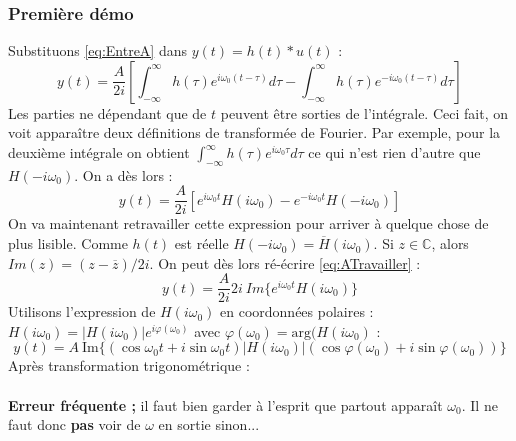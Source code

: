 \subsubsection{Première démo}
Substituons \autoref{eq:EntreA} dans $y(t) = h(t)*u(t)$ :
\begin{equation}
	y(t) = \dfrac{A}{2i}\left[\int_{-\infty}^\infty h(\tau)e^{i\omega_0(t-\tau)}d\tau-
	\int_{-\infty}^\infty h(\tau)e^{-i\omega_0(t-\tau)}d\tau\right]
\end{equation}
Les parties ne dépendant que de $t$ peuvent être sorties de l'intégrale. Ceci fait, 
on voit apparaître deux définitions de transformée de Fourier. Par exemple, pour la 
deuxième intégrale on obtient $\int_{-\infty}^\infty h(\tau)e^{i\omega_0\tau}d\tau$
ce qui n'est rien d'autre que $H(-i\omega_0)$. On a dès lors :
\begin{equation}
	y(t) = \dfrac{A}{2i}\left[e^{i\omega_0t}H(i\omega_0)-e^{-i\omega_0t}H(-i\omega_0)
	\right]
	\label{eq:ATravailler}
\end{equation}
On va maintenant retravailler cette expression pour arriver à quelque chose de plus 
lisible. Comme $h(t)$ est réelle $H(-i\omega_0) = \overline{H}(i\omega_0)$. Si $z\in
\mathbb{C}$, alors $Im(z) = (z-\overline{z})/2i$. On peut dès lors ré-écrire 
\autoref{eq:ATravailler} :
\begin{equation}
	y(t) = \frac{A}{2i}2i\ Im\{e^{i\omega_0t}H(i\omega_0)\}
\end{equation}
Utilisons l'expression de $H(i\omega_0)$ en coordonnées polaires : $H(i\omega_0) = 
|H(i\omega_0)|e^{i\varphi(\omega_0)}$ avec $\varphi(\omega_0) = \text{arg}(H(
i\omega_0)$ :
\begin{equation}
	y(t) = A\ \text{Im}\{(\cos\omega_0t + i\sin\omega_0t)|H(i\omega_0)|(\cos\varphi(\omega_0)
	+i\sin\varphi(\omega_0))\}
\end{equation}
Après transformation trigonométrique :\\
	
\ \\	
\textbf{Erreur fréquente ;} il faut bien garder à l'esprit que partout apparaît $\omega_0$.
Il ne faut donc \textbf{pas} voir de $\omega$ en sortie sinon...
	
	
